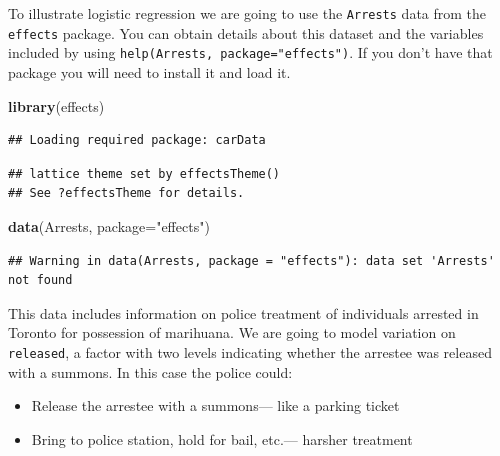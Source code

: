\documentclass[]{book}
\newenvironment{Shaded}{\begin{snugshade}}{\end{snugshade}}
\newcommand{\DataTypeTok}[1]{\textcolor[rgb]{0.13,0.29,0.53}{#1}}
\newcommand{\KeywordTok}[1]{\textcolor[rgb]{0.13,0.29,0.53}{\textbf{#1}}}
\newcommand{\NormalTok}[1]{#1}
\newcommand{\OperatorTok}[1]{\textcolor[rgb]{0.81,0.36,0.00}{\textbf{#1}}}
\newcommand{\StringTok}[1]{\textcolor[rgb]{0.31,0.60,0.02}{#1}}
\theoremstyle{definition}
\theoremstyle{definition}
\theoremstyle{definition}
\theoremstyle{remark}
\begin{document}
To illustrate logistic regression we are going to use the
\texttt{Arrests} data from the \texttt{effects} package. You can obtain
details about this dataset and the variables included by using
\texttt{help(Arrests,\ package="effects")}. If you don't have that
package you will need to install it and load it.

\begin{Shaded}
\begin{Highlighting}[]
\KeywordTok{library}\NormalTok{(effects)}
\end{Highlighting}
\end{Shaded}

\begin{verbatim}
## Loading required package: carData
\end{verbatim}

\begin{verbatim}
## lattice theme set by effectsTheme()
## See ?effectsTheme for details.
\end{verbatim}

\begin{Shaded}
\begin{Highlighting}[]
\KeywordTok{data}\NormalTok{(Arrests, }\DataTypeTok{package=}\StringTok{"effects"}\NormalTok{)}
\end{Highlighting}
\end{Shaded}

\begin{verbatim}
## Warning in data(Arrests, package = "effects"): data set 'Arrests' not found
\end{verbatim}

This data includes information on police treatment of individuals
arrested in Toronto for possession of marihuana. We are going to model
variation on \texttt{released}, a factor with two levels indicating
whether the arrestee was released with a summons. In this case the
police could:

\begin{itemize}
\item
  Release the arrestee with a summons--- like a parking ticket
\item
  Bring to police station, hold for bail, etc.--- harsher treatment
\end{itemize}

\begin{Shaded}
\end{Shaded}
\end{document}
